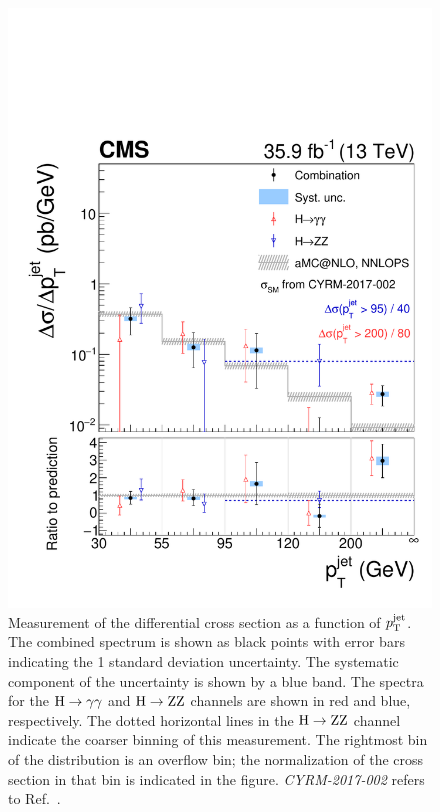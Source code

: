 \begin{figure}[hbtp]
  \begin{center}
    \includegraphics[width=0.49\linewidth]{img/differentials/spectra_ptjet.pdf}
    \caption{
        Measurement of the differential cross section as a function of $p_\mathrm{T}^\text{jet} $. The combined spectrum is shown as black points with error bars indicating the 1 standard deviation uncertainty. The systematic component of the uncertainty is shown by a blue band. The spectra for the $\mathrm{H}\to\mathrm{\gamma}\mathrm{\gamma}$ and $\mathrm{H}\to\mathrm{Z}\mathrm{Z}$ channels are shown in red and blue, respectively.
        The dotted horizontal lines in the $\mathrm{H}\to\mathrm{Z}\mathrm{Z}$ channel indicate the coarser binning of this measurement.
        The rightmost bin of the distribution is an overflow bin; the normalization of the cross section in that bin is indicated in the figure.
        \textit{CYRM-2017-002} refers to Ref.~\cite{deFlorian:2016spz}.
        }
    \label{fig:CombinedSpectra_ptjet}
  \end{center}
\end{figure}
